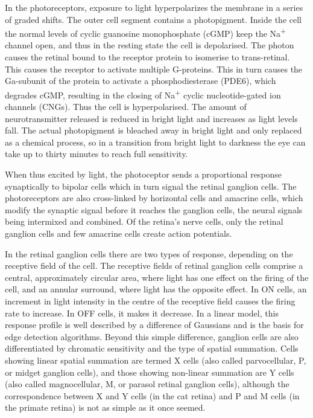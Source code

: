 In the photoreceptors, exposure to light hyperpolarizes the membrane in a series of graded shifts. The outer cell segment contains a photopigment. Inside the cell the normal levels of cyclic guanosine monophosphate (cGMP) keep the Na\textsuperscript{+} channel open, and thus in the resting state the cell is depolarised. The photon causes the retinal bound to the receptor protein to isomerise to trans-retinal. This causes the receptor to activate multiple G-proteins. This in turn causes the Ga-subunit of the protein to activate a phosphodiesterase (PDE6), which degrades cGMP, resulting in the closing of Na\textsuperscript{+} cyclic nucleotide-gated ion channels (CNGs). Thus the cell is hyperpolarised. The amount of neurotransmitter released is reduced in bright light and increases as light levels fall. The actual photopigment is bleached away in bright light and only replaced as a chemical process, so in a transition from bright light to darkness the eye can take up to thirty minutes to reach full sensitivity.

When thus excited by light, the photoceptor sends a proportional response synaptically to bipolar cells which in turn signal the retinal ganglion cells. The photoreceptors are also cross-linked by horizontal cells and amacrine cells, which modify the synaptic signal before it reaches the ganglion cells, the neural signals being intermixed and combined. Of the retina's nerve cells, only the retinal ganglion cells and few amacrine cells create action potentials.

In the retinal ganglion cells there are two types of response, depending on the receptive field of the cell. The receptive fields of retinal ganglion cells comprise a central, approximately circular area, where light has one effect on the firing of the cell, and an annular surround, where light has the opposite effect. In ON cells, an increment in light intensity in the centre of the receptive field causes the firing rate to increase. In OFF cells, it makes it decrease. In a linear model, this response profile is well described by a difference of Gaussians and is the basis for edge detection algorithms. Beyond this simple difference, ganglion cells are also differentiated by chromatic sensitivity and the type of spatial summation. Cells showing linear spatial summation are termed X cells (also called parvocellular, P, or midget ganglion cells), and those showing non-linear summation are Y cells (also called magnocellular, M, or parasol retinal ganglion cells), although the correspondence between X and Y cells (in the cat retina) and P and M cells (in the primate retina) is not as simple as it once seemed.

